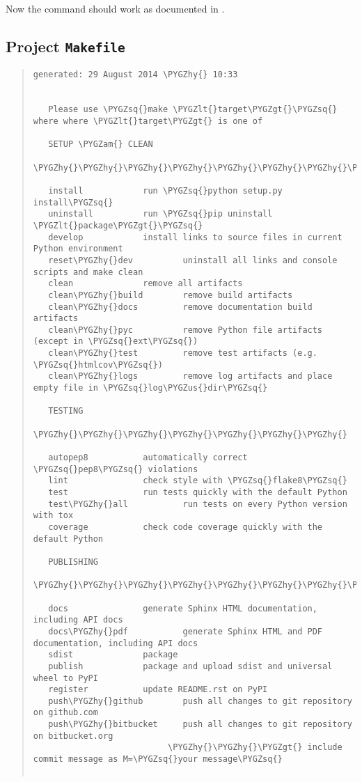 \documentclass[letterpaper,10pt,english]{sphinxmanual}
\def\PYGZus{\char`\_}
\def\PYGZam{\char`\&}
\def\PYGZlt{\char`\<}
\def\PYGZgt{\char`\>}
\def\PYGZhy{\char`\-}
\def\PYGZsq{\char`\'}
\begin{document}
Now the  command should work as documented in .


\subsection{Project \texttt{Makefile}}
\label{contributing:project-makefile}\begin{quote}

\begin{Verbatim}[commandchars=\\\{\}]
generated: 29 August 2014 \PYGZhy{} 10:33


   Please use \PYGZsq{}make \PYGZlt{}target\PYGZgt{}\PYGZsq{} where where \PYGZlt{}target\PYGZgt{} is one of

   SETUP \PYGZam{} CLEAN
   \PYGZhy{}\PYGZhy{}\PYGZhy{}\PYGZhy{}\PYGZhy{}\PYGZhy{}\PYGZhy{}\PYGZhy{}\PYGZhy{}\PYGZhy{}\PYGZhy{}\PYGZhy{}\PYGZhy{}

   install            run \PYGZsq{}python setup.py install\PYGZsq{}
   uninstall          run \PYGZsq{}pip uninstall \PYGZlt{}package\PYGZgt{}\PYGZsq{}
   develop            install links to source files in current Python environment
   reset\PYGZhy{}dev          uninstall all links and console scripts and make clean
   clean              remove all artifacts
   clean\PYGZhy{}build        remove build artifacts
   clean\PYGZhy{}docs         remove documentation build artifacts
   clean\PYGZhy{}pyc          remove Python file artifacts (except in \PYGZsq{}ext\PYGZsq{})
   clean\PYGZhy{}test         remove test artifacts (e.g. \PYGZsq{}htmlcov\PYGZsq{})
   clean\PYGZhy{}logs         remove log artifacts and place empty file in \PYGZsq{}log\PYGZus{}dir\PYGZsq{}

   TESTING
   \PYGZhy{}\PYGZhy{}\PYGZhy{}\PYGZhy{}\PYGZhy{}\PYGZhy{}\PYGZhy{}

   autopep8           automatically correct \PYGZsq{}pep8\PYGZsq{} violations
   lint               check style with \PYGZsq{}flake8\PYGZsq{}
   test               run tests quickly with the default Python
   test\PYGZhy{}all           run tests on every Python version with tox
   coverage           check code coverage quickly with the default Python

   PUBLISHING
   \PYGZhy{}\PYGZhy{}\PYGZhy{}\PYGZhy{}\PYGZhy{}\PYGZhy{}\PYGZhy{}\PYGZhy{}\PYGZhy{}\PYGZhy{}

   docs               generate Sphinx HTML documentation, including API docs
   docs\PYGZhy{}pdf           generate Sphinx HTML and PDF documentation, including API docs
   sdist              package
   publish            package and upload sdist and universal wheel to PyPI
   register           update README.rst on PyPI
   push\PYGZhy{}github        push all changes to git repository on github.com
   push\PYGZhy{}bitbucket     push all changes to git repository on bitbucket.org
                           \PYGZhy{}\PYGZhy{}\PYGZgt{} include commit message as M=\PYGZsq{}your message\PYGZsq{}


\end{Verbatim}
\end{quote}
\end{document}
